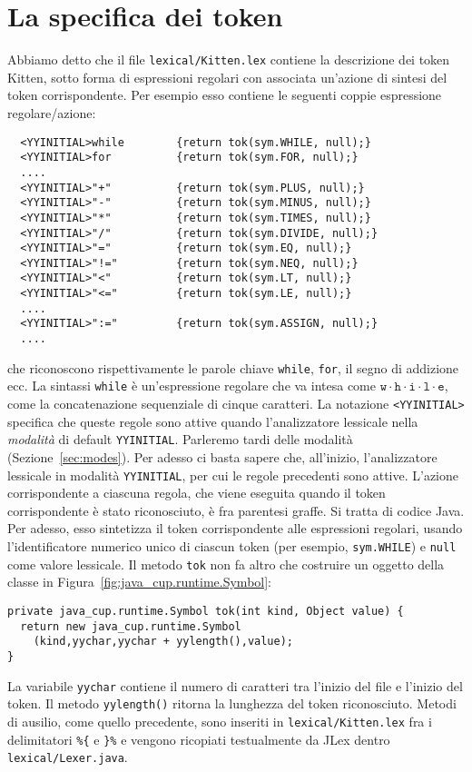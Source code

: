 \section{La specifica dei token}\label{sec:token_specification}
%
Abbiamo detto che il file \texttt{lexical/Kitten.lex} contiene la
descrizione dei token Kitten, sotto forma di espressioni regolari con
associata un'azione di
sintesi del token corrispondente. Per esempio esso contiene le
seguenti coppie espressione regolare/azione:
%
\begin{verbatim}
  <YYINITIAL>while        {return tok(sym.WHILE, null);}
  <YYINITIAL>for          {return tok(sym.FOR, null);}
  ....
  <YYINITIAL>"+"          {return tok(sym.PLUS, null);}
  <YYINITIAL>"-"          {return tok(sym.MINUS, null);}
  <YYINITIAL>"*"          {return tok(sym.TIMES, null);}
  <YYINITIAL>"/"          {return tok(sym.DIVIDE, null);}
  <YYINITIAL>"="          {return tok(sym.EQ, null);}
  <YYINITIAL>"!="         {return tok(sym.NEQ, null);}
  <YYINITIAL>"<"          {return tok(sym.LT, null);}
  <YYINITIAL>"<="         {return tok(sym.LE, null);}
  ....
  <YYINITIAL>":="         {return tok(sym.ASSIGN, null);}
  ....
\end{verbatim}
%
che riconoscono rispettivamente
le parole chiave \texttt{while}, \texttt{for}, il segno di addizione ecc.
La sintassi \texttt{while} \`e un'espressione regolare che va intesa
come $\mathtt{w}\cdot\mathtt{h}\cdot\mathtt{i}\cdot\mathtt{l}\cdot\mathtt{e}$,
\cioe come la concatenazione sequenziale di cinque caratteri. La notazione
\texttt{<YYINITIAL>} specifica che queste regole sono attive quando
l'analizzatore lessicale \e nella \emph{modalit\`a} di default
\texttt{YYINITIAL}.
Parleremo \piu tardi delle modalit\`a (Sezione~\ref{sec:modes}).
Per adesso ci basta sapere che, all'inizio, l'analizzatore lessicale \e
in modalit\`a \texttt{YYINITIAL}, per cui le regole precedenti sono attive.
L'azione corrispondente a ciascuna regola, che viene eseguita quando
il token corrispondente \`e stato riconosciuto, \`e fra parentesi graffe.
Si tratta di codice Java. Per adesso, esso sintetizza il token
corrispondente alle espressioni regolari, usando l'identificatore
numerico unico di ciascun token
(per esempio, \texttt{sym.WHILE}) e \texttt{null} come valore
lessicale. Il metodo \texttt{tok} non fa altro che costruire un oggetto
della classe in Figura~\ref{fig:java_cup.runtime.Symbol}:
%
\begin{verbatim}
private java_cup.runtime.Symbol tok(int kind, Object value) {
  return new java_cup.runtime.Symbol
    (kind,yychar,yychar + yylength(),value);
}
\end{verbatim}
%
La variabile \texttt{yychar} contiene il numero di caratteri tra l'inizio del
file e l'inizio del token. Il metodo \texttt{yylength()} ritorna
la lunghezza del token riconosciuto.
Metodi di ausilio, come quello precedente, sono inseriti in
\texttt{lexical/Kitten.lex} fra i delimitatori \verb!%{! e
\verb!}%! e vengono ricopiati testualmente da JLex dentro
\texttt{lexical/Lexer.java}.

